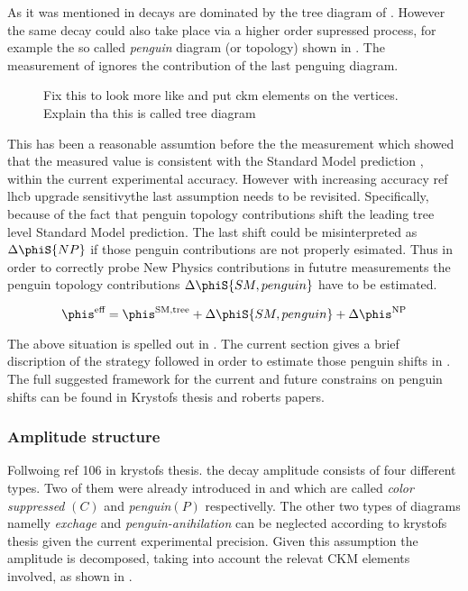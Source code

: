 As it was mentioned in  \BsJpsiPhi decays are dominated by the tree diagram of .
However the same decay could also take place via a higher order supressed process, for example the so called {\it penguin} diagram (or topology)
shown in . The \phis measurement of  ignores the contribution of the last penguing diagram.

\begin{figure}[h]
  \centering
  {\sffamily }
  \caption{{\color{red} Fix this to look more like  and put ckm elements on the vertices}. Explain tha this is called tree diagram}
  \label{bs2jpsiphi_peng}
\end{figure}

\noindent This has been a reasonable assumtion before the the \lhcb measurement which showed that the measured  value is consistent with the Standard
Model prediction , within the current experimental accuracy. However with increasing accuracy {\color{red} ref lhcb upgrade \phis sensitivy}the last assumption needs to be revisited.
Specifically, because of the fact that penguin topology contributions shift the leading tree level Standard Model prediction.
The last shift could be misinterpreted as $\Delta\phiS{NP}$ if those penguin contributions are not properly esimated.
Thus in order to correctly probe New Physics contributions in fututre measurements the penguin topology contributions $\Delta\phiS{SM,penguin}$
have to be estimated.

\begin{equation}
\phis^{\text {eff}} = \phis^{\tiny \text{SM,tree}} + \Delta\phiS{SM, penguin} + \Delta\phis^{\tiny \text{NP}}
 \label{phis_sm_peng}
\end{equation}

\noindent The above situation is spelled out in . The current section gives a brief discription
of the strategy followed in order to estimate those penguin shifts in \phis. The full suggested framework for the
current and future constrains on penguin shifts can be found in {\color{red} Krystofs thesis and roberts papers.}

\subsubsection{Amplitude structure}
Follwoing {\color{red} ref 106 in krystofs thesis.} the \BsJpsiPhi decay amplitude consists of four different types.
Two of them were already introduced in  and  which are called {\it color suppressed }$(C)$ and {\it penguin}$(P)$
respectivelly. The other two types of diagrams namelly {\it exchage} and {\it penguin-anihilation} can be neglected according to {\color{red} krystofs thesis}
given the current experimental precision. Given this assumption the \BsJpsiPhi amplitude is decomposed, taking into account the
relevat CKM elements involved, as shown in .

